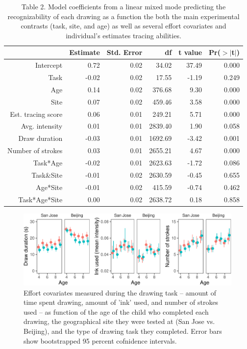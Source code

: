 \documentclass[
  english,
  man]{apa6}
\begin{document}
\begin{table}[ht]
\centering
\begin{tabular}{rrrrrr}
  \hline
 & Estimate & Std. Error & df & t value & Pr($>$$|$t$|$) \\
  \hline
Intercept & 0.72 & 0.02 & 34.02 & 37.49 & 0.000 \\
  Task & -0.02 & 0.02 & 17.55 & -1.19 & 0.249 \\
  Age & 0.14 & 0.02 & 376.68 & 9.30 & 0.000 \\
  Site & 0.07 & 0.02 & 459.46 & 3.58 & 0.000 \\
  Est. tracing score & 0.06 & 0.01 & 249.21 & 5.71 & 0.000 \\
  Avg. intensity & 0.01 & 0.01 & 2839.40 & 1.90 & 0.058 \\
  Draw duration & -0.03 & 0.01 & 1692.69 & -3.42 & 0.001 \\
  Number of strokes & 0.03 & 0.01 & 2655.21 & 4.67 & 0.000 \\
  Task*Age & -0.02 & 0.01 & 2623.63 & -1.72 & 0.086 \\
  Task\&Site & -0.01 & 0.02 & 2630.59 & -0.45 & 0.655 \\
  Age*Site & -0.01 & 0.02 & 415.59 & -0.74 & 0.462 \\
  Task*Age*Site & 0.00 & 0.02 & 2638.72 & 0.18 & 0.858 \\
   \hline
\end{tabular}
\caption{Table 2. Model coefficients from a linear mixed mode predicting the recognizability of each drawing as a function the both the main experimental contrasts (task, site, and age) as well as several effort covariates and individual's estimates tracing abilities.}
\end{table}

\begin{figure}[H]

{\centering \includegraphics[width=\textwidth]{Manuscript_June2021_files/figure-latex/effort-covariates-1} 

}

\caption{Effort covariates measured during the drawing task -- amount of time spent drawing, amount of 'ink' used, and number of strokes used -- as function of the age of the child who completed each drawing, the geographical site they were tested at (San Jose vs. Beijing), and the type of drawing task they completed. Error bars show bootstrapped 95 percent cofnidence intervals.}\label{fig:effort-covariates}
\end{figure}
\end{document}
